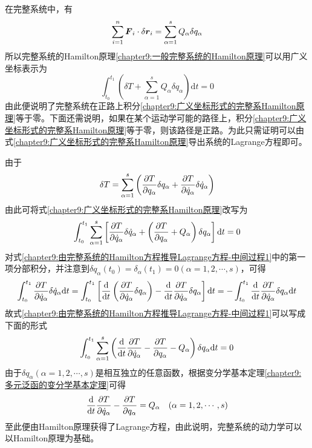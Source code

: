 在完整系统中，有
\begin{equation}
	\sum_{i=1}^n \boldsymbol{F}_i \cdot \delta \boldsymbol{r}_i = \sum_{\alpha=1}^s Q_\alpha \delta q_\alpha
\end{equation}
所以完整系统的Hamilton原理\eqref{chapter9:一般完整系统的Hamilton原理}可以用广义坐标表示为
\begin{equation}
	\int_{t_0}^{t_1} \left(\delta T + \sum_{\alpha=1}^s Q_\alpha \delta q_\alpha\right) \mathrm{d} t = 0
	\label{chapter9:广义坐标形式的完整系Hamilton原理}
\end{equation}
由此便说明了完整系统在正路上积分\eqref{chapter9:广义坐标形式的完整系Hamilton原理}等于零。下面还需说明，如果在某个运动学可能的路径上，积分\eqref{chapter9:广义坐标形式的完整系Hamilton原理}等于零，则该路径是正路。为此只需证明可以由式\eqref{chapter9:广义坐标形式的完整系Hamilton原理}导出系统的Lagrange方程即可。

由于
\begin{equation}
	\delta T = \sum_{\alpha=1}^s \left(\frac{\partial T}{\partial q_\alpha}\delta q_\alpha + \frac{\partial T}{\partial \dot{q}_\alpha}\delta\dot{q}_\alpha \right)
\end{equation}
由此可将式\eqref{chapter9:广义坐标形式的完整系Hamilton原理}改写为
\begin{equation}
	\int_{t_0}^{t_1} \sum_{\alpha=1}^s \left[\frac{\partial T}{\partial \dot{q}_\alpha}\delta\dot{q}_\alpha+ \left(\frac{\partial T}{\partial q_\alpha} + Q_\alpha\right) \delta q_\alpha\right] \mathrm{d} t = 0
	\label{chapter9:由完整系统的Hamilton方程推导Lagrange方程-中间过程1}
\end{equation}
对式\eqref{chapter9:由完整系统的Hamilton方程推导Lagrange方程-中间过程1}中的第一项分部积分，并注意到$\delta q_\alpha(t_0)=\delta_\alpha(t_1)=0(\alpha=1,2,\cdots,s)$，可得
\begin{equation*}
	\int_{t_0}^{t_1} \frac{\partial T}{\partial \dot{q}_\alpha}\delta \dot{q}_\alpha\mathrm{d} t = \int_{t_0}^{t_1} \left[\dfrac{\mathrm{d}}{\mathrm{d} t} \left(\frac{\partial T}{\partial \dot{q}_\alpha}\delta q_\alpha\right) - \dfrac{\mathrm{d}}{\mathrm{d} t} \frac{\partial T}{\partial \dot{q}_\alpha} \delta q_\alpha \right] \mathrm{d} t = -\int_{t_0}^{t_1} \dfrac{\mathrm{d}}{\mathrm{d} t} \frac{\partial T}{\partial \dot{q}_\alpha} \delta q_\alpha \mathrm{d} t
\end{equation*}
故式\eqref{chapter9:由完整系统的Hamilton方程推导Lagrange方程-中间过程1}可以写成下面的形式
\begin{equation}
	\int_{t_0}^{t_1} \sum_{\alpha=1}^s \left(\dfrac{\mathrm{d}}{\mathrm{d} t}\frac{\partial T}{\partial \dot{q}_\alpha} - \frac{\partial T}{\partial q_\alpha} - Q_\alpha \right) \delta q_\alpha \mathrm{d} t = 0
\end{equation}
由于$\delta q_\alpha(\alpha=1,2,\cdots,s)$是相互独立的任意函数，根据变分学基本定理\ref{chapter9:多元泛函的变分学基本定理}可得
\begin{equation*}
	\dfrac{\mathrm{d}}{\mathrm{d} t}\frac{\partial T}{\partial \dot{q}_\alpha} - \frac{\partial T}{\partial q_\alpha} = Q_\alpha\quad (\alpha=1,2,\cdots,s)
\end{equation*}
至此便由Hamilton原理获得了Lagrange方程，由此说明，完整系统的动力学可以以Hamilton原理为基础。

